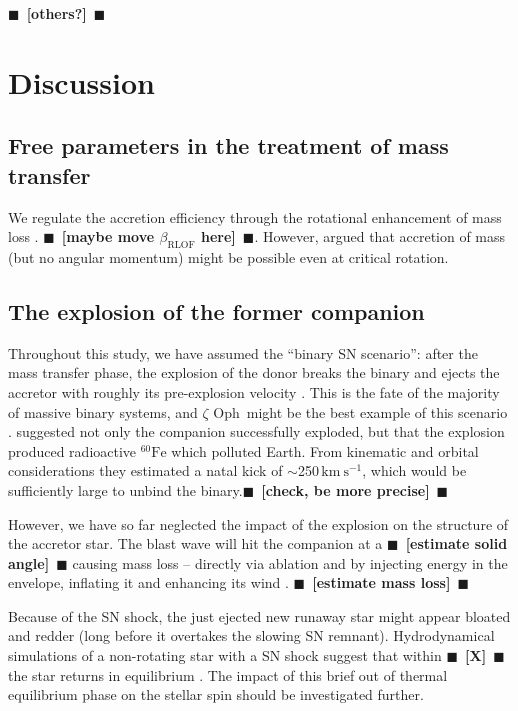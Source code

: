 \documentclass[twocolumn,twocolappendix,trackchanges]{aastex63}
\newcommand{\kms}{{\mathrm{km\ s^{-1}}}}
\newcommand{\zoph}{$\zeta$ Oph}
\newcommand{\todo}[1]{{\large $\blacksquare$~\textbf{\color{red}[#1]}}~$\blacksquare$}
\begin{document}
\todo{others?}

\section{Discussion}
\label{sec:discussio}

\subsection{Free parameters in the treatment of mass transfer}
\label{sec:free_param}

We regulate the accretion efficiency through the rotational
enhancement of mass loss \citep[e.g.][]{langer:98}. \todo{maybe move
  $\beta_\mathrm{RLOF}$ here}. However,
\citep{popov:91, paczinski:91} argued that accretion of mass (but no
angular momentum) might be possible even at critical rotation.

\subsection{The explosion of the former companion}
\label{sec:SN_comp}

Throughout this study, we have assumed the ``binary SN scenario'':
after the mass transfer phase, the explosion of the donor breaks the
binary and ejects the accretor with roughly its pre-explosion velocity
\citep[e.g.,][]{renzo:19walk}. This is the fate of the majority of
massive binary systems, and \zoph\ might be the best example of this
scenario \citep[e.g.,][]{blaauw:52, blaauw:61,
  hoogerwerf:00}. \cite{neuhauser:20} suggested not only the companion
successfully exploded, but that the explosion produced radioactive
$^{60}\mathrm{Fe}$ which polluted Earth. From kinematic and orbital
considerations they estimated a natal kick of $\sim$250\,$\kms$, which
would be sufficiently large to unbind the binary.\todo{check, be more
  precise}

However, we have so far neglected the impact of the explosion on the
structure of the accretor star. The blast wave will hit the companion
at a \todo{estimate solid angle} causing mass loss -- directly via
ablation and by injecting energy in the envelope, inflating it and
enhancing its wind \citep{wheeler:75, tauris:98, podsiadlowski:03, hirai:18}.
\todo{estimate mass loss}


Because of the SN shock, the just ejected new runaway star might
appear bloated and redder (long before it overtakes the slowing SN
remnant). Hydrodynamical simulations of a non-rotating star
with a SN shock suggest that within \todo{X} the star returns
in equilibrium \cite{hirai:18}. The impact of this brief out of
thermal equilibrium phase on the stellar spin should be investigated
further.
\end{document}
